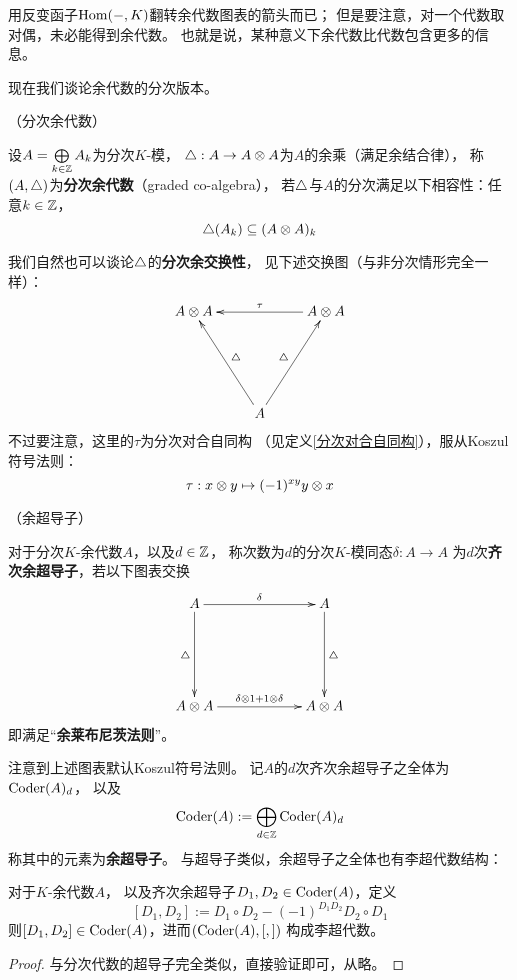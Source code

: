 用反变函子$\operatorname{Hom}(-,K)$翻转余代数图表的箭头而已；
但是要注意，对一个代数取对偶，未必能得到余代数。
也就是说，某种意义下余代数比代数包含更多的信息。

现在我们谈论余代数的分次版本。

\begin{definition}（分次余代数）

设$A=\bigoplus\limits_{k\in\mathbb{Z}}A_k$为分次$K$-模，
$\triangle:A\to A\otimes A$为$A$的余乘（满足余结合律），
称$(A,\triangle)$为\textbf{分次余代数}（graded co-algebra），
若$\triangle$与$A$的分次满足以下相容性：任意$k\in\mathbb{Z}$，
$$\triangle(A_k)\subseteq (A\otimes A)_k$$
\end{definition}

我们自然也可以谈论$\triangle$的\textbf{分次余交换性}，
见下述交换图（与非分次情形完全一样）：
$$
\xybigrow
  \xymatrix{
    A\ten A
    &&
    A\ten A \ar[ll]_{\tau}
  \\
    &A \ar[ul]_{\yc}\ar[ur]^{\yc}
    &
  }
$$
不过要注意，这里的$\tau$为分次对合自同构
（见定义\ref{分次对合自同构}），服从Koszul符号法则：
$$\tau: x\otimes y\mapsto (-1)^{xy}y\otimes x$$


\begin{definition}（余超导子）%

对于分次$K$-余代数$A$，以及$d\in\mathbb{Z}$，
称次数为$d$的分次$K$-模同态$\delta:A\to A$
为$d$次\textbf{齐次余超导子}，若以下图表交换
$$
  \xybigrow
  \xybigcol
  \xymatrix{
      A  \ar[r]^{\delta}  \ar[d]_{\yc}
    & A  \ar[d]^{\yc}
  \\
      A\ten A \ar[r]^-{\delta\ten 1+1\ten\delta}
    & A\ten A
  }
$$
即满足“\textbf{余莱布尼茨法则}”。
\end{definition}
注意到上述图表默认Koszul符号法则。
记$A$的$d$次齐次余超导子之全体为$\operatorname{Coder}(A)_d$，
以及
$$\operatorname{Coder}(A):=\bigoplus_{d\in\mathbb{Z}}\operatorname{Coder}(A)_d$$
称其中的元素为\textbf{余超导子}。
与超导子类似，余超导子之全体也有李超代数结构：

\begin{prop}对于$K$-余代数$A$，
以及齐次余超导子$D_1,D_2\in\operatorname{Coder}(A)$，定义
$$[D_1,D_2]:=D_1\circ D_2-(-1)^{D_1D_2}D_2\circ D_1$$
则$[D_1,D_2]\in\operatorname{Coder}(A)$，进而$(\operatorname{Coder}(A),[,])$
构成李超代数。
\end{prop}
\begin{proof}
与分次代数的超导子完全类似，直接验证即可，从略。
\end{proof}

